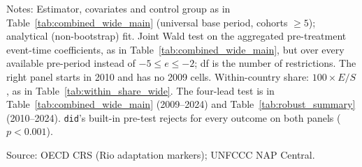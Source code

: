 \begin{table}[H]
\centering
\caption{Pre-trend tests over the full pre-treatment window}
\label{tab:pretrend_tests_full}
\par\vspace{4pt}
\begin{minipage}{\linewidth}\footnotesize
Notes: Estimator, covariates and control group as in Table~\ref{tab:combined_wide_main} (universal base period, cohorts $\geq 5$); analytical (non-bootstrap) fit. Joint Wald test on the aggregated pre-treatment event-time coefficients, as in Table~\ref{tab:combined_wide_main}, but over every available pre-period instead of $-5 \leq e \leq -2$; df is the number of restrictions. The right panel starts in 2010 and has no 2009 cells. Within-country share: $100 \times E/S$, as in Table~\ref{tab:within_share_wide}. The four-lead test is in Table~\ref{tab:combined_wide_main} (2009--2024) and Table~\ref{tab:robust_summary} (2010--2024). \texttt{did}'s built-in pre-test rejects for every outcome on both panels ($p<0.001$).\par
Source: OECD CRS (Rio adaptation markers); UNFCCC NAP Central.
\end{minipage}
\end{table}
